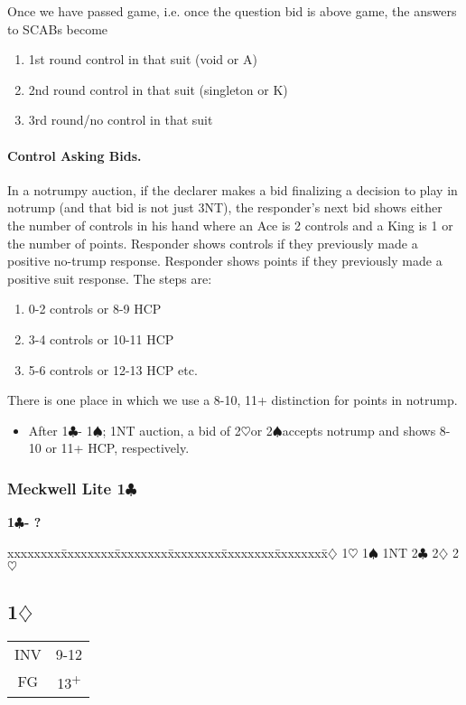 \documentclass[10pt]{article}
\renewcommand{\c}{$\clubsuit$}
\renewcommand{\d}{$\diamondsuit$}
\newcommand{\h}{$\heartsuit$}
\newcommand{\s}{$\spadesuit$}
\newcommand{\p}{\textsuperscript{+}}
\newenvironment{bidtable}[1][]
{\textbf{#1}
  \begin{adjustwidth}{1em}{}
    \addvspace{2pt}
    \begin{tabbing}
      xxxxxxxx\=xxxxxxxx\=xxxxxxxx\=xxxxxxxx\=xxxxxxxx\=xxxxxxxx\=\kill}
{\end{tabbing}\end{adjustwidth}\bigskip}%
\newcommand{\pdfc}{\texorpdfstring{\c{}}{C}}
\newcommand{\pdfd}{\texorpdfstring{\d{}}{D}}
\begin{document}
\begin{multicols*}{2}
Once we have passed game, i.e. once the question bid is above game, the answers
to SCABs become
\begin{enumerate}
\item 1st round control in that suit (void or A)
\item 2nd round control in that suit (singleton or K)
\item 3rd round/no control in that suit
\end{enumerate}

\paragraph{Control Asking Bids.}

In a notrumpy auction, if the declarer makes a bid finalizing a decision to play
in notrump (and that bid is not just 3NT), the responder’s next bid shows either
the number of controls in his hand where an Ace is 2 controls and a King is 1 or
the number of points. Responder shows controls if they previously made a
positive no-trump response. Responder shows points if they previously made a
positive suit response. The steps are:
\begin{enumerate}
\item 0-2 controls or 8-9 HCP
\item 3-4 controls or 10-11 HCP
\item 5-6 controls or 12-13 HCP etc.
\end{enumerate}
There is one place in which we use a 8-10, 11+ distinction for points in notrump.
\begin{itemize}
\item After 1\c - 1\s; 1NT auction, a bid of 2\h or 2\s accepts notrump and shows
  8-10 or 11+ HCP, respectively.
\end{itemize}
\newpage

\subsubsection{Meckwell Lite 1\pdfc}

\begin{bidtable}[1\c - ?]
1\d
1\h
1\s
1NT
2\c
2\d
2\h

\end{bidtable}
\subsection{1\pdfd}

\begin{tabular}{c|c}
INV & 9-12 \\
FG  & 13\p \\
\end{tabular}


\end{multicols*}
\end{document}
